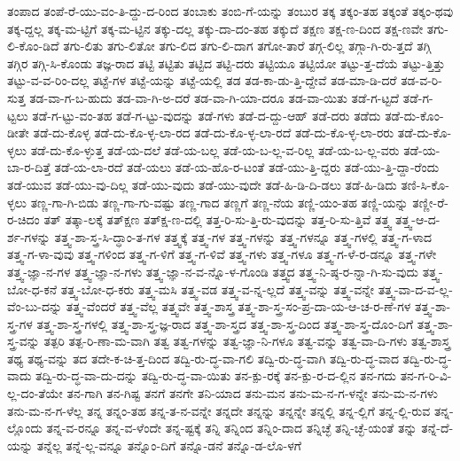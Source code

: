 {ತಂಪಾದ
ತಂಪೆ-ರೆ-ಯು-ವಂ-ತಿ-ದ್ದು-ದ-ರಿಂದ
ತಂಬಾಕು
ತಂಬಿ-ಗೆ-ಯನ್ನು
ತಂಬುರ
ತಕ್ಕ
ತಕ್ಕಂ-ತಹ
ತಕ್ಕಂತೆ
ತಕ್ಕಂ-ಥವು
ತಕ್ಕ-ದ್ದಲ್ಲ
ತಕ್ಕ-ಮ-ಟ್ಟಿಗೆ
ತಕ್ಕ-ಮ-ಟ್ಟಿನ
ತಕ್ಕು-ದಲ್ಲ
ತಕ್ಕು-ದಾ-ದಂ-ತಹ
ತಕ್ಕುದೆ
ತಕ್ಷಣ
ತಕ್ಷ-ಣ-ದಿಂದ
ತಕ್ಷ-ಣವೇ
ತಗು-ಲಿ-ಕೊಂ-ಡಿದೆ
ತಗು-ಲಿತು
ತಗು-ಲಿತೋ
ತಗು-ಲಿದ
ತಗು-ಲಿ-ದಾಗ
ತಗೋ-ತಾರೆ
ತಗ್ಗ-ಲಿಲ್ಲ
ತಗ್ಗಾ-ಗಿ-ರು-ತ್ತದೆ
ತಗ್ಗಿ
ತಗ್ಗಿರ
ತಗ್ಗಿ-ಸಿ-ಕೊಂಡು
ತಜ್ಞ-ರಾದ
ತಟ್ಟಿ
ತಟ್ಟಿತು
ತಟ್ಟಿದ
ತಟ್ಟಿ-ದರು
ತಟ್ಟಿಯೂ
ತಟ್ಟಿಯೋ
ತಟ್ಟು-ತ್ತ-ದೆಯೆ
ತಟ್ಟು-ತ್ತಿತ್ತು
ತಟ್ಟು-ವ-ವ-ರಿಂ-ದಲ್ಲ
ತಟ್ಟೆ-ಗಳ
ತಟ್ಟೆ-ಯನ್ನು
ತಟ್ಟೆ-ಯಲ್ಲಿ
ತಡ
ತಡ-ಕಾ-ಡು-ತ್ತಿ-ದ್ದೇವೆ
ತಡ-ಮಾ-ಡಿ-ದರೆ
ತಡ-ವ-ರಿ-ಸುತ್ತ
ತಡ-ವಾ-ಗ-ಬ-ಹುದು
ತಡ-ವಾ-ಗಿ-ಅ-ದರೆ
ತಡ-ವಾ-ಗಿ-ಯಾ-ದರೂ
ತಡ-ವಾ-ಯಿತು
ತಡೆ-ಗ-ಟ್ಟದೆ
ತಡೆ-ಗ-ಟ್ಟಲು
ತಡೆ-ಗ-ಟ್ಟು-ವಂ-ತಹ
ತಡೆ-ಗ-ಟ್ಟು-ವುದನ್ನು
ತಡೆ-ಗಳು
ತಡೆ-ದ-ದ್ದು-ಆಹ್
ತಡೆ-ದರು
ತಡೆದು
ತಡೆ-ದು-ಕೊಂ-ಡೀತೇ
ತಡೆ-ದು-ಕೊಳ್ಳ
ತಡೆ-ದು-ಕೊ-ಳ್ಳ-ಲಾ-ರದ
ತಡೆ-ದು-ಕೊ-ಳ್ಳ-ಲಾ-ರದೆ
ತಡೆ-ದು-ಕೊ-ಳ್ಳ-ಲಾ-ರರು
ತಡೆ-ದು-ಕೊ-ಳ್ಳಲು
ತಡೆ-ದು-ಕೊ-ಳ್ಳುತ್ತ
ತಡೆ-ಯ-ದಲೆ
ತಡೆ-ಯ-ಬಲ್ಲ
ತಡೆ-ಯ-ಬ-ಲ್ಲ-ವ-ರಿಲ್ಲ
ತಡೆ-ಯ-ಬ-ಲ್ಲ-ವರು
ತಡೆ-ಯ-ಬಾ-ರ-ದಿತ್ತೆ
ತಡೆ-ಯ-ಲಾ-ರದೆ
ತಡೆ-ಯಲು
ತಡೆ-ಯ-ಹೊ-ರ-ಟಂತೆ
ತಡೆ-ಯು-ತ್ತಿ-ದ್ದರು
ತಡೆ-ಯು-ತ್ತಿ-ದ್ದಾ-ರೆಂದು
ತಡೆ-ಯುವ
ತಡೆ-ಯು-ವು-ದಿಲ್ಲ
ತಡೆ-ಯು-ವುದು
ತಡೆ-ಯು-ವುದೇ
ತಡೆ-ಹಿ-ಡಿ-ದಿ-ಡಲು
ತಡೆ-ಹಿ-ಡಿದು
ತಣಿ-ಸಿ-ಕೊ-ಳ್ಳಲು
ತಣ್ಣ-ಗಾ-ಗಿ-ಬಿಡು
ತಣ್ಣ-ಗಾ-ಗು-ವಷ್ಟು
ತಣ್ಣ-ಗಾದ
ತಣ್ಣಗೆ
ತಣ್ಣ-ನೆಯ
ತಣ್ಣಿ-ಯಂ-ತಹ
ತಣ್ಣಿ-ಯನ್ನು
ತಣ್ಣೀ-ರೆ-ರ-ಚಿದಂ
ತತ್
ತತ್ಕಾ-ಲಕ್ಕೆ
ತತ್ಕ್ಷಣ
ತತ್ಕ್ಷ-ಣ-ದಲ್ಲಿ
ತತ್ತ-ರಿ-ಸು-ತ್ತಿ-ರು-ವುದನ್ನು
ತತ್ತ-ರಿ-ಸು-ತ್ತಿವೆ
ತತ್ತ್ವ
ತತ್ತ್ವ-ಆ-ದ-ರ್ಶ-ಗಳನ್ನು
ತತ್ತ್ವ-ಶಾ-ಸ್ತ್ರ-ಸಿ-ದ್ಧಾಂ-ತ-ಗಳ
ತತ್ತ್ವಕ್ಕೆ
ತತ್ತ್ವ-ಗಳ
ತತ್ತ್ವ-ಗಳನ್ನು
ತತ್ತ್ವ-ಗಳನ್ನೂ
ತತ್ತ್ವ-ಗಳಲ್ಲಿ
ತತ್ತ್ವ-ಗ-ಳಾದ
ತತ್ತ್ವ-ಗ-ಳಾ-ವುವು
ತತ್ತ್ವ-ಗಳಿಂದ
ತತ್ತ್ವ-ಗ-ಳಿಗೆ
ತತ್ತ್ವ-ಗ-ಳಿವೆ
ತತ್ತ್ವ-ಗಳು
ತತ್ತ್ವ-ಗಳೂ
ತತ್ತ್ವ-ಗ-ಳೆ-ರ-ಡನ್ನೂ
ತತ್ತ್ವ-ಗಳೇ
ತತ್ತ್ವ-ಜ್ಞಾ-ನ-ಗಳ
ತತ್ತ್ವ-ಜ್ಞಾ-ನ-ಗಳು
ತತ್ತ್ವ-ಜ್ಞಾ-ನ-ವ-ನ್ನೊ-ಳ-ಗೊಂಡಿ
ತತ್ತ್ವದ
ತತ್ತ್ವ-ನಿ-ಷ್ಠ-ರ-ನ್ನಾ-ಗಿ-ಸು-ವುದು
ತತ್ತ್ವ-ಬೋ-ಧ-ಕನೆ
ತತ್ತ್ವ-ಬೋ-ಧ-ಕರು
ತತ್ತ್ವ-ಮಸಿ
ತತ್ತ್ವ-ವಡ
ತತ್ತ್ವ-ವ-ನ್ನ-ಲ್ಲದೆ
ತತ್ತ್ವ-ವನ್ನು
ತತ್ತ್ವ-ವನ್ನೇ
ತತ್ತ್ವ-ವಾ-ದ-ವ-ಲ್ಲ-ವೆಂ-ಬು-ದನ್ನು
ತತ್ತ್ವ-ವೆಂದರೆ
ತತ್ತ್ವ-ವೆಲ್ಲ
ತತ್ತ್ವವೇ
ತತ್ತ್ವ-ಶಾಸ್ತ್ರ
ತತ್ತ್ವ-ಶಾ-ಸ್ತ್ರ-ಸಂ-ಪ್ರ-ದಾ-ಯ-ಆ-ಚ-ರ-ಣೆ-ಗಳ
ತತ್ತ್ವ-ಶಾ-ಸ್ತ್ರ-ಗಳ
ತತ್ತ್ವ-ಶಾ-ಸ್ತ್ರ-ಗಳಲ್ಲಿ
ತತ್ತ್ವ-ಶಾ-ಸ್ತ್ರ-ಜ್ಞ-ರಾದ
ತತ್ತ್ವ-ಶಾ-ಸ್ತ್ರದ
ತತ್ತ್ವ-ಶಾ-ಸ್ತ್ರ-ದಿಂದ
ತತ್ತ್ವ-ಶಾ-ಸ್ತ್ರ-ದೊಂ-ದಿಗೆ
ತತ್ತ್ವ-ಶಾ-ಸ್ತ್ರ-ವನ್ನು
ತತ್ಪರಿ
ತತ್ಪ-ರಿ-ಣಾ-ಮ-ವಾಗಿ
ತತ್ವ
ತತ್ವ-ಗಳನ್ನು
ತತ್ವ-ಜ್ಞಾ-ನಿ-ಗಳೂ
ತತ್ವ-ವನ್ನು
ತತ್ವ-ವಾ-ದಿ-ಗಳು
ತತ್ವ-ಶಾಸ್ತ್ರ
ತಥ್ಯ
ತಥ್ಯ-ವನ್ನು
ತದ
ತದೇ-ಕ-ಚಿ-ತ್ತ-ದಿಂದ
ತದ್ವಿ-ರು-ದ್ಧ-ವಾ-ಗಲಿ
ತದ್ವಿ-ರು-ದ್ಧ-ವಾಗಿ
ತದ್ವಿ-ರು-ದ್ಧ-ವಾದ
ತದ್ವಿ-ರು-ದ್ಧ-ವಾದು
ತದ್ವಿ-ರು-ದ್ಧ-ವಾ-ದು-ದನ್ನು
ತದ್ವಿ-ರು-ದ್ಧ-ವಾ-ಯಿತು
ತನ-ಕ್ಪು-ರಕ್ಕೆ
ತನ-ಕ್ಪು-ರ-ದ-ಲ್ಲಿನ
ತನ-ಗದು
ತನ-ಗ-ರಿ-ವಿ-ಲ್ಲ-ದಂ-ತೆಯೇ
ತನ-ಗಾಗಿ
ತನ-ಗಿಷ್ಟ
ತನಗೆ
ತನಗೇ
ತನಿ-ಯಾದ
ತನು-ಮನ
ತನು-ಮ-ನ-ಗ-ಳನ್ನೇ
ತನು-ಮ-ನ-ಗಳು
ತನು-ಮ-ನ-ಗ-ಳೆಲ್ಲ
ತನ್ನ
ತನ್ನಂ-ತಹ
ತನ್ನ-ತ-ನ-ವನ್ನೇ
ತನ್ನದೇ
ತನ್ನನ್ನು
ತನ್ನನ್ನೇ
ತನ್ನಲ್ಲಿ
ತನ್ನ-ಲ್ಲಿಗೆ
ತನ್ನ-ಲ್ಲಿ-ರುವ
ತನ್ನ-ಲ್ಲೊಂದು
ತನ್ನ-ವ-ರನ್ನೂ
ತನ್ನ-ವ-ಳೆಂದೇ
ತನ್ನ-ಷ್ಟಕ್ಕೆ
ತನ್ನಿ
ತನ್ನಿಂದ
ತನ್ನಿಂ-ದಾದ
ತನ್ನಿಚ್ಛೆ
ತನ್ನಿ-ಚ್ಛೆ-ಯಂತೆ
ತನ್ನು
ತನ್ನೆ-ದೆ-ಯನ್ನು
ತನ್ನೆಲ್ಲ
ತನ್ನೆ-ಲ್ಲ-ವನ್ನೂ
ತನ್ನೊಂ-ದಿಗೆ
ತನ್ನೊ-ಡನೆ
ತನ್ನೊ-ಡ-ಲೊ-ಳಗೆ
}
